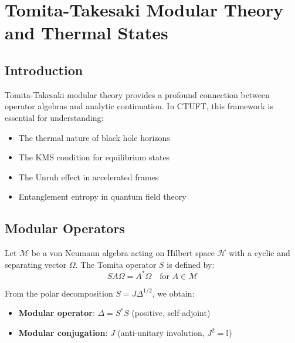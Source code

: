 \section{Tomita-Takesaki Modular Theory and Thermal States}
\label{sec:tomita_takesaki}

\subsection{Introduction}

Tomita-Takesaki modular theory \cite{takesaki1970} provides a profound connection between operator algebras and analytic continuation. In CTUFT, this framework is essential for understanding:
\begin{itemize}
    \item The thermal nature of black hole horizons
    \item The KMS condition for equilibrium states
    \item The Unruh effect in accelerated frames
    \item Entanglement entropy in quantum field theory
\end{itemize}

\subsection{Modular Operators}

\begin{definition}
Let $\mathcal{M}$ be a von Neumann algebra acting on Hilbert space $\mathcal{H}$ with a cyclic and separating vector $\Omega$. The Tomita operator $S$ is defined by:
\begin{equation}
    S A\Omega = A^*\Omega \quad \text{for } A \in \mathcal{M}
\end{equation}
\end{definition}

\begin{definition}
From the polar decomposition $S = J\Delta^{1/2}$, we obtain:
\begin{itemize}
    \item \textbf{Modular operator}: $\Delta = S^* S$ (positive, self-adjoint)
    \item \textbf{Modular conjugation}: $J$ (anti-unitary involution, $J^2 = \mathbb{I}$)
\end{itemize}
\end{definition}

